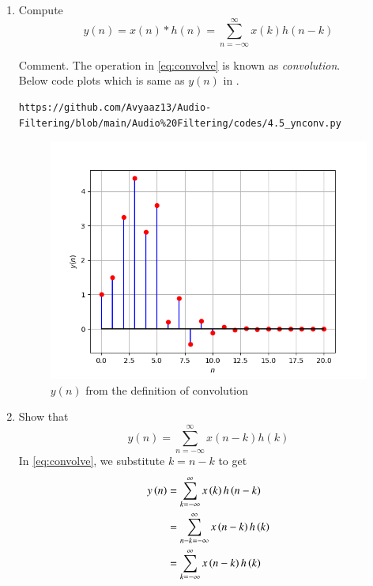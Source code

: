 \documentclass[journal,12pt,twocolumn]{IEEEtran}
\theoremstyle{remark}
\renewcommand\thesection{\arabic{section}}
\numberwithin{equation}{subsection}
\begin{document}
\begin{enumerate}[label=\thesection.\arabic*]
\item Compute 
\begin{equation}
\label{eq:convolve}
y(n) = x(n)*h(n) = \sum_{n=-\infty}^{\infty}x(k)h(n-k)
\end{equation}

Comment. The operation in \eqref{eq:convolve} is known as
{\em convolution}.
%
\\
\solution Below code plots  which is same as 
$y(n)$ in
. 

\begin{lstlisting}
https://github.com/Avyaaz13/Audio-Filtering/blob/main/Audio%20Filtering/codes/4.5_ynconv.py
\end{lstlisting}
\begin{figure}[!ht]
\centering
\includegraphics[width=\columnwidth]{figs/y_by_conv.png}
\caption{$y(n)$ from the definition of convolution}
\label{fig:ynconv}
\end{figure}

\item Show that
\begin{equation}
y(n) =  \sum_{n=-\infty}^{\infty}x(n-k)h(k)
\end{equation}
\solution
In \eqref{eq:convolve}, we substitute $k = n - k$ to get
\begin{align}
y\left(n\right) &= \sum_{k=-\infty}^{\infty}x\left(k\right)h\left(n - k\right) \\
		  &= \sum_{n - k=-\infty}^{\infty}x\left(n - k\right)h\left(k\right) \\
		  &= \sum_{k=-\infty}^{\infty}x\left(n - k\right)h\left(k\right)
\end{align}
\end{enumerate}
\end{document}

